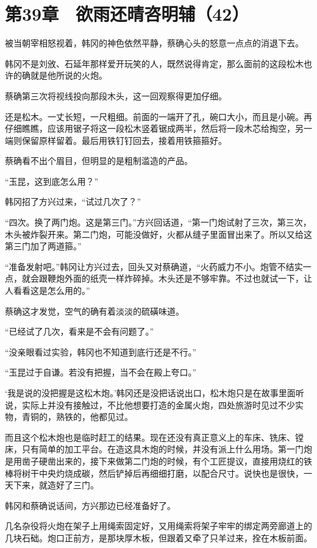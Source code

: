 \section{第39章　欲雨还晴咨明辅（42）}

被当朝宰相怒视着，韩冈的神色依然平静，蔡确心头的怒意一点点的消退下去。

韩冈不是刘攽、石延年那样爱开玩笑的人，既然说得肯定，那么面前的这段松木也许的确就是他所说的火炮。

蔡确第三次将视线投向那段木头，这一回观察得更加仔细。

还是松木。一丈长短，一尺粗细。前面的一端开了孔，碗口大小，而且是小碗。再仔细瞧瞧，应该用锯子将这一段松木竖着锯成两半，然后将一段木芯给掏空，另一端则保留原样留着。最后用铁钉钉回去，接着用铁箍箍好。

蔡确看不出个眉目，但明显的是粗制滥造的产品。

“玉昆，这到底怎么用？”

韩冈招了方兴过来，“试过几次了？”

“四次。换了两门炮。这是第三门。”方兴回话道，“第一门炮试射了三次，第三次，木头被炸裂开来。第二门炮，可能没做好，火都从缝子里面冒出来了。所以又给这第三门加了两道箍。”

“准备发射吧。”韩冈让方兴过去，回头又对蔡确道，“火药威力不小。炮管不结实一点，就会跟鞭炮外面的纸壳一样炸碎掉。木头还是不够牢靠。不过也就试一下，让人看看这是怎么用的。”

蔡确这才发觉，空气的确有着淡淡的硫磺味道。

“已经试了几次，看来是不会有问题了。”

“没亲眼看过实验，韩冈也不知道到底行还是不行。”

“玉昆过于自谦。若没有把握，当不会在殿上夸口。”

‘我是说的没把握是这松木炮。’韩冈还是没把话说出口，松木炮只是在故事里面听说，实际上并没有接触过，不比他想要打造的金属火炮，四处旅游时见过不少实物，青铜的，熟铁的，他都见过。

而且这个松木炮也是临时赶工的结果。现在还没有真正意义上的车床、铣床、镗床，只有简单的加工平台。在造这具木炮的时候，并没有派上什么用场。第一门炮是用凿子硬凿出来的，接下来做第二门炮的时候，有个工匠提议，直接用烧红的铁棒将树干中央灼烧成碳，然后铲掉后再细细打磨，以配合尺寸。说快也是很快，一天下来，就造好了三门。

韩冈和蔡确说话间，方兴那边已经准备好了。

几名杂役将火炮在架子上用绳索固定好，又用绳索将架子牢牢的绑定两旁廊道上的几块石础。炮口正前方，是那块厚木板，但跟着又牵了只羊过来，拴在木板前面。

